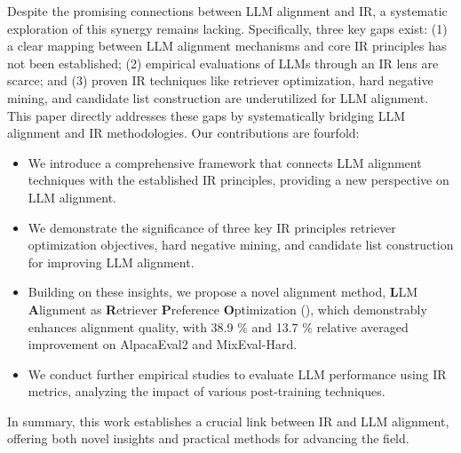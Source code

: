 Despite the promising connections between LLM alignment and IR, a systematic exploration of this synergy remains lacking. 
Specifically, three key gaps exist: 
(1) a clear mapping between LLM alignment mechanisms and core IR principles has not been established; 
(2) empirical evaluations of LLMs through an IR lens are scarce; and 
(3) proven IR techniques like retriever optimization, hard negative mining, and candidate list construction are underutilized for LLM alignment.
This paper directly addresses these gaps by systematically bridging LLM alignment and IR methodologies.
Our contributions are fourfold:
\begin{itemize}[leftmargin=*]
\item We introduce a comprehensive framework that connects LLM alignment techniques with the established IR principles, providing a new perspective on LLM alignment.
\item We demonstrate the significance of three key IR principles  \text{-} retriever optimization objectives, hard negative mining, and candidate list construction \text{-} for improving LLM alignment.
\item Building on these insights, we propose a novel alignment method, \textbf{L}LM \textbf{A}lignment as \textbf{R}etriever \textbf{P}reference \textbf{O}ptimization (\Ours), which demonstrably enhances alignment quality, with 38.9 \% and 13.7 \% relative averaged improvement on AlpacaEval2 and MixEval-Hard.
\item We conduct further empirical studies to evaluate LLM performance using IR metrics, analyzing the impact of various post-training techniques.
\end{itemize}
In summary, this work establishes a crucial link between IR and LLM alignment, offering both novel insights and practical methods for advancing the field.
